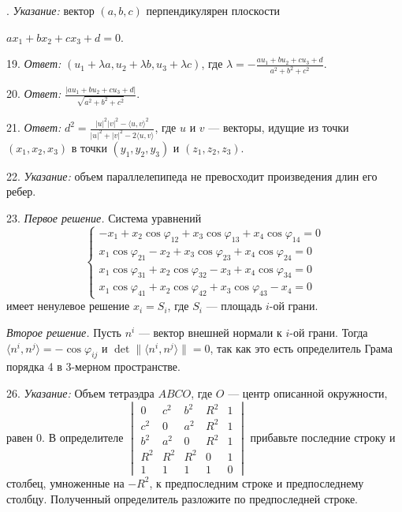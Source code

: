 	. \textit{Указание:} вектор $(a, b, c)$ перпендикулярен плоскости 

	$ax_1 + bx_2 + cx_3 + d = 0$.

	19. \textit{Ответ:} $(u_1 + \lambda a, u_2 + \lambda b, u_3 + \lambda c)$, где $\lambda = -\frac{au_1 + bu_2 + cu_3 + d}{a^2 + b^2 + c^2}$.

	20. \textit{Ответ:} $\frac{|au_1 + bu_2 + cu_3 + d|}{\sqrt{a^2 + b^2 + c^2}}$.

	21. \textit{Ответ:} $d^2 = \frac{|u|^2|v|^2 - \langle u, v \rangle^2}{|u|^2 + |v|^2 - 2\langle u, v \rangle}$, где $u$ и $v$ — векторы, идущие из точки $(x_1, x_2, x_3)$ в точки $(y_1, y_2, y_3)$ и $(z_1, z_2, z_3)$.

	22. \textit{Указание:} объем параллелепипеда не превосходит произведения длин его ребер.

	23. \textit{Первое решение.} Система уравнений 
	\[ \begin{cases} -x_1 + x_2 \cos \varphi_{12} + x_3 \cos \varphi_{13} + x_4 \cos \varphi_{14} = 0 \\ x_1 \cos \varphi_{21} - x_2 + x_3 \cos \varphi_{23} + x_4 \cos \varphi_{24} = 0 \\ x_1 \cos \varphi_{31} + x_2 \cos \varphi_{32} - x_3 + x_4 \cos \varphi_{34} = 0 \\ x_1 \cos \varphi_{41} + x_2 \cos \varphi_{42} + x_3 \cos \varphi_{43} - x_4 = 0 \end{cases} \]
	имеет ненулевое решение $x_i = S_i$, где $S_i$ — площадь $i$-ой грани.

	\textit{Второе решение.} Пусть $n^i$ — вектор внешней нормали к $i$-ой грани. Тогда $\langle n^i, n^j \rangle = -\cos \varphi_{ij}$ и $\det \| \langle n^i, n^j \rangle \| = 0$, так как это есть определитель Грама порядка 4 в 3-мерном пространстве.

	26. \textit{Указание:} Объем тетраэдра $ABCO$, где $O$ — центр описанной окружности, равен 0. В определителе $\begin{vmatrix} 0 & c^2 & b^2 & R^2 & 1 \\ c^2 & 0 & a^2 & R^2 & 1 \\ b^2 & a^2 & 0 & R^2 & 1 \\ R^2 & R^2 & R^2 & 0 & 1 \\ 1 & 1 & 1 & 1 & 0 \end{vmatrix}$ прибавьте последние строку и столбец, умноженные на $-R^2$, к предпоследним строке и предпоследнему столбцу. Полученный определитель разложите по предпоследней строке.


